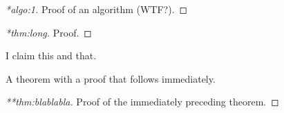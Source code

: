 \documentclass[12pt,a5paper]{article}
\begin{document}
\begin{proof}[*algo:1]
  Proof of an algorithm (WTF?).
\end{proof}

\begin{proof}[*thm:long]
  Proof.
\end{proof}

\begin{claim}
  I claim this and that.
\end{claim}

\cleardoublepage

\begin{theorem}
  \label{thm:blablabla}
  A theorem with a proof that follows immediately.
\end{theorem}
\begin{proof}[**thm:blablabla]
  Proof of the immediately preceding theorem.
\end{proof}
\end{document}

